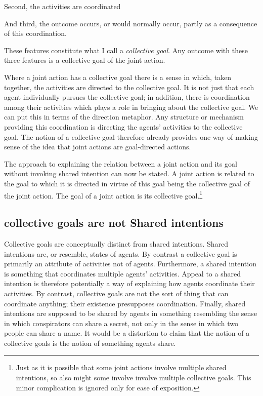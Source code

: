 \documentclass[14pt,a4paper]{extarticle}
\begin{document}
Second, the activities are coordinated

And third, the outcome occurs, or would normally occur, partly as a consequence of this coordination.  

These features constitute what I call a \emph{collective goal}.  Any outcome with these three features is a collective goal of the joint action.

Where a joint action has a collective goal there is a sense in which, taken together, the activities are directed to the collective goal.  It is not just that each agent individually pursues the collective goal; in addition, there is coordination among their activities which plays a role in bringing about the collective goal.  We can put this in terms of the direction metaphor.  Any structure or mechanism providing this coordination is directing the agents' activities to the collective goal.  The notion of a collective goal therefore already provides one way of making sense of the idea that joint actions are goal-directed actions.

The approach to explaining the relation between a joint action and its goal without invoking shared intention can now be stated.  A joint action is related to the goal to which it is directed in virtue of this goal  being the collective goal of the joint action.  The goal of a joint action is its collective goal.\footnote{  
Just as it is possible that some joint actions involve multiple shared intentions, so also might some involve involve multiple collective goals.  This minor complication is ignored only for ease of exposition.
}


\subsection{collective goals are not Shared intentions}
Collective goals are conceptually distinct from shared intentions.  Shared intentions are, or resemble, states of agents.  By contrast a collective goal is primarily an attribute of activities not of agents.  Furthermore, a shared intention is something that coordinates multiple agents' activities.  Appeal to a shared intention is therefore potentially a way of explaining how agents coordinate their activities.  By contrast, collective goals are not the sort of thing that can coordinate anything; their existence presupposes coordination.  Finally, shared intentions are supposed to be shared by agents in something resembling the sense in which conspirators can share a secret, not only in the sense in which two people can share a name.  It would be a distortion to claim that the notion of a collective goals is the notion of something agents share.
\end{document}
